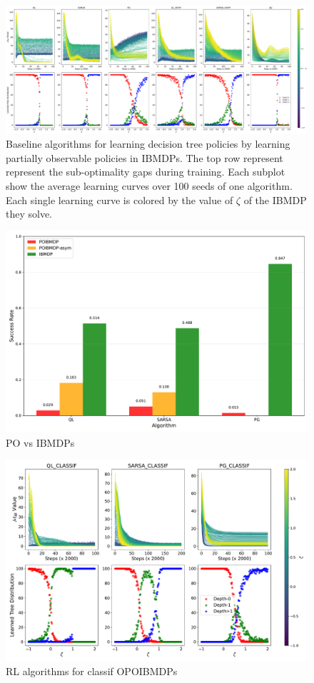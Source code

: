 \begin{figure}
    \centering
    \includegraphics[width=1\textwidth]{images/images_part1/quick_plot_combined_all.pdf}
    \caption{Baseline algorithms for learning decision tree policies by learning partially observable policies in IBMDPs. 
    The top row represent represent the sub-optimality gaps during training. Each subplot show the average learning curves over 100 seeds of one algorithm. Each single learning curve is colored by the value of $\zeta$ of the IBMDP they solve.
    }\label{fig:rl-poibmdp}
\end{figure}
\begin{figure}
    \centering
    \includegraphics[width=1\textwidth]{images/images_part1/algorithm_performance_comparison_flattened.pdf}
    \caption{PO vs IBMDPs}\label{fig:po-vs-ib}
\end{figure}
\begin{figure}
    \centering
    \includegraphics[width=1\textwidth]{images/images_part1/quick_plot_combined_classif.pdf}
    \caption{RL algorithms for classif OPOIBMDPs}\label{fig:rl-poibmdp}
\end{figure}
